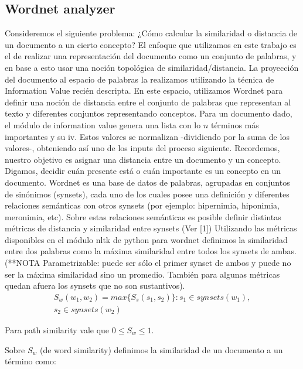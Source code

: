 \documentclass{pnastwo}
\begin{document}
\begin{article}
\subsection{Wordnet analyzer}
Consideremos el siguiente problema:
\newline
¿Cómo calcular la similaridad o distancia de un documento a un cierto concepto? 
\newline
El enfoque que utilizamos en este trabajo es el de realizar una representación del documento como un conjunto de palabras, y en base a esto usar una noción topológica de similaridad/distancia. La proyección del documento al espacio de palabras la realizamos utilizando la t\'ecnica de Information Value reci\'en descripta.
En este espacio, utilizamos Wordnet para definir una noción de distancia entre el conjunto de palabras que representan al texto y diferentes conjuntos representando conceptos.
\newline
Para un documento dado, el módulo de information value genera una lista con lo $n$ términos más importantes y su iv. Estos valores se normalizan -dividiendo por la suma de los valores-, obteniendo así uno de los inputs del proceso siguiente. Recordemos, nuestro objetivo es asignar una distancia entre un documento y un concepto. Digamos, decidir cuán presente está o cuán importante es un concepto en un documento.
\newline
Wordnet es una base de datos de palabras, agrupadas en conjuntos de sinónimos (synsets), cada uno de los cuales posee una definición y diferentes relaciones semánticas con otros synsets (por ejemplo: hipernimia, hiponimia, meronimia, etc). Sobre estas relaciones semánticas es posible definir distintas métricas de distancia y similaridad entre synsets (Ver [1])
\newline
Utilizando las métricas disponibles en el módulo nltk de python para wordnet definimos la similaridad entre dos palabras como la máxima similaridad entre todos los synsets de ambas. (**NOTA Parametrizable: puede ser sólo el primer synset de ambos y puede no ser la máxima similaridad sino un promedio. También para algunas métricas quedan afuera los synsets que no son sustantivos). 
\begin{multline}
S_w(w_1, w_2) = max \{ S_s(s_1, s_2) \}: s_1 \in synsets(w_1),\\ s_2 \in synsets(w_2)
\end{multline}

Para path similarity vale que $0 \leq S_w \leq 1$. 

Sobre $S_w$ (de word similarity) definimos la similaridad de un documento a un término como:


\end{article}
\end{document}
